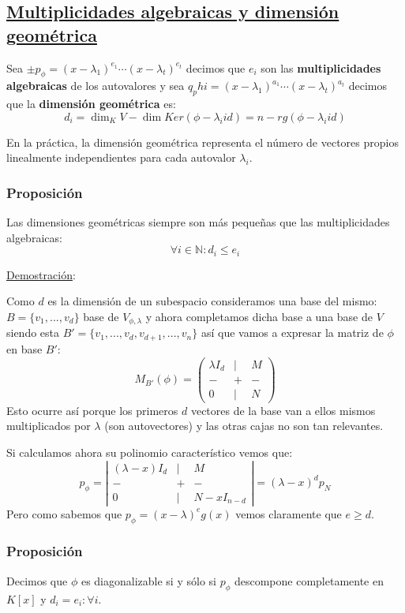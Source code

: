 \documentclass[10pt,a4paper,openright]{book}
\begin{document}
\subsection*{\underline{Multiplicidades algebraicas y dimensión geométrica}}
Sea $\pm p_\phi=(x-\lambda_1)^{e_1}\cdots (x-\lambda_t)^{e_t}$ decimos que $e_i$ son las \textbf{multiplicidades algebraicas} de los autovalores y sea $q_phi=(x-\lambda_1)^{a_1}\cdots (x-\lambda_t)^{a_t}$ decimos que la \textbf{dimensión geométrica} es:
$$d_i=\dim_K V- \dim Ker(\phi-\lambda_i id)=n-rg(\phi-\lambda_i id)$$

En la práctica, la dimensión geométrica representa el número de vectores propios linealmente independientes para cada autovalor $\lambda_i$.

\subsubsection*{Proposición}
Las dimensiones geométricas siempre son más pequeñas que las multiplicidades algebraicas:
$$\forall i \in \mathbb N: d_i\leq e_i$$

\underline{Demostración}:

Como $d$ es la dimensión de un subespacio consideramos una base del mismo: $B=\{v_1, ..., v_d\}$ base de $V_{\phi, \lambda}$ y ahora completamos dicha base a una base de $V$ siendo esta $B'=\{v_1,...,v_d, v_{d+1},..., v_n\}$ así que vamos a expresar la matriz de $\phi$ en base $B'$:
$$M_{B'}(\phi)=\begin{pmatrix}\lambda I_d & | & M\\ -&+&-\\0&|&N\end{pmatrix}$$
Esto ocurre así porque los primeros $d$ vectores de la base van a ellos mismos multiplicados por $\lambda$ (son autovectores) y las otras cajas no son tan relevantes.

Si calculamos ahora su polinomio característico vemos que:
$$p_\phi=\left|\begin{array}{ccc}(\lambda-x) I_d & | & M\\ -&+&-\\0&|&N-xI_{n-d}\end{array}\right|=(\lambda-x)^d p_N$$
Pero como sabemos que $p_\phi=(x-\lambda)^e g(x)$ vemos claramente que $e\geq d$.

\subsubsection*{Proposición}
Decimos que $\phi$ es diagonalizable si y sólo si $p_\phi$ descompone completamente en $K[x]$ y $d_i=e_i:\forall i$.
\end{document}
